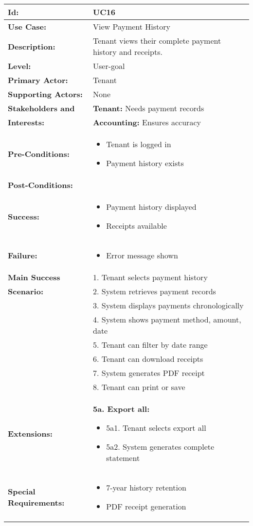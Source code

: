 \documentclass[12pt]{article}
\begin{document}
\begin{tabular}{|p{3cm}|p{11cm}|}
\hline
\textbf{Id:} & UC16 \\
\hline
\textbf{Use Case:} & View Payment History \\
\hline
\textbf{Description:} & Tenant views their complete payment history and receipts. \\
\hline
\textbf{Level:} & User-goal \\
\hline
\textbf{Primary Actor:} & Tenant \\
\hline
\textbf{Supporting Actors:} & None \\
\hline
\textbf{Stakeholders and} & \textbf{Tenant:} Needs payment records \\
\textbf{Interests:} & \textbf{Accounting:} Ensures accuracy \\
\hline
\textbf{Pre-Conditions:} & 
\begin{itemize}
    \item Tenant is logged in
    \item Payment history exists
\end{itemize} \\
\hline
\textbf{Post-Conditions:} & \\
\textbf{Success:} & 
\begin{itemize}
    \item Payment history displayed
    \item Receipts available
\end{itemize} \\
\textbf{Failure:} & 
\begin{itemize}
    \item Error message shown
\end{itemize} \\
\hline
\textbf{Main Success} & 1. Tenant selects payment history \\
\textbf{Scenario:} & 2. System retrieves payment records \\
& 3. System displays payments chronologically \\
& 4. System shows payment method, amount, date \\
& 5. Tenant can filter by date range \\
& 6. Tenant can download receipts \\
& 7. System generates PDF receipt \\
& 8. Tenant can print or save \\
\hline
\textbf{Extensions:} & 
\textbf{5a. Export all:}
\begin{itemize}
    \item 5a1. Tenant selects export all
    \item 5a2. System generates complete statement
\end{itemize} \\
\hline
\textbf{Special Requirements:} & 
\begin{itemize}
    \item 7-year history retention
    \item PDF receipt generation
\end{itemize} \\
\hline
\end{tabular}
\end{document}
